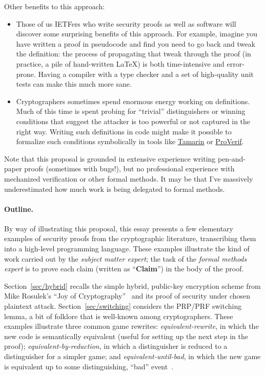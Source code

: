 \documentclass{article}
\begin{document}
Other benefits to this approach:

\begin{itemize}
  \item Those of us IETFers who write security proofs as well as software will
    discover some surprising benefits of this approach.
    For example, imagine you have written a proof in pseudocode and find you
    need to go back and tweak the definition: the process of propagating that
    tweak through the proof (in practice, a pile of hand-written \LaTeX) is
    both time-intensive and error-prone. Having a compiler with a type checker
    and a set of high-quality unit tests can make this much more sane.

  \item Cryptographers sometimes spend enormous energy working on definitions.
    Much of this time is spent probing for ``trivial'' distinguishers or
    winning conditions that suggest the attacker is too powerful or not
    captured in the right way.
    Writing such definitions in code might make it possible to formalize such
    conditions symbolically in tools like
    \href{https://tamarin-prover.com/}{Tamarin} or
    \href{https://bblanche.gitlabpages.inria.fr/proverif/}{ProVerif}.
\end{itemize}

Note that this proposal is grounded in extensive experience writing
pen-and-paper proofs (sometimes with bugs!), but no professional experience
with mechanized verification or other formal methods.
%
It may be that I've massively underestimated how much work is being delegated
to formal methods.

\paragraph{Outline.}
%
By way of illustrating this proposal, this essay presents a few elementary
examples of security proofs from the cryptographic literature, transcribing
them into a high-level programming language.
%
These examples illustrate the kind of work carried out by the \emph{subject
matter expert}; the task of the \emph{formal methods expert} is to prove each
claim (written as ``\textbf{Claim}'') in the body of the proof.

Section~\ref{sec/hybrid} recalls the simple hybrid, public-key encryption
scheme from Mike Rosulek's ``Joy of Cryptography''~\cite{joy} and its proof of
security under chosen plaintext attack.
%
Section~\ref{sec/switching} considers the PRP/PRF switching lemma, a bit of
folklore that is well-known among cryptographers.
%
These examples illustrate three common game rewrites:
%
\emph{equivalent-rewrite}, in which the new code is semantically equivalent
(useful for setting up the next step in the proof);
%
\emph{equivalent-by-reduction}, in which a distinguisher is reduced to a
distinguisher for a simpler game; and
%
\emph{equivalent-until-bad}, in which the new game is equivalent up to some
distinguishing, ``bad'' event~\cite{BR06}.
\end{document}
